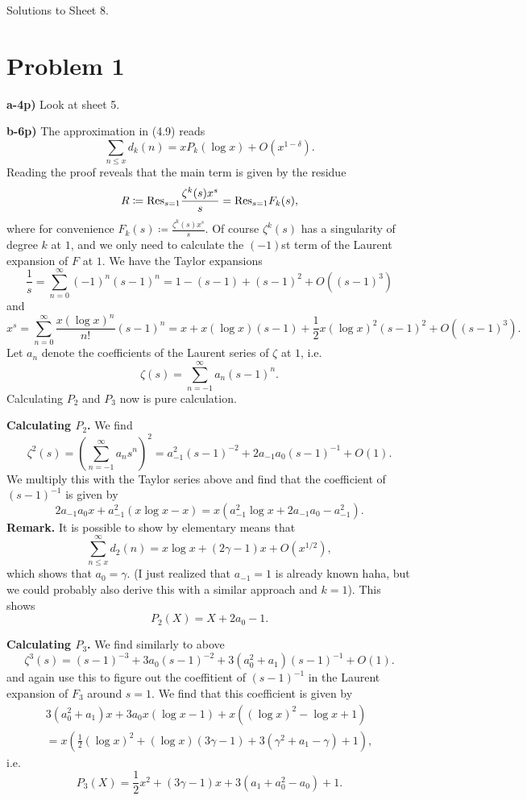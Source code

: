 \documentclass[a4paper,11pt]{article}
\author{Max von Consbruch}
\begin{document}
\begin{center}
    \huge{Solutions to Sheet 8.}
\end{center}

\section*{Problem 1}
\textbf{a-4p)} Look at sheet 5.

\textbf{b-6p)} The approximation in (4.9) reads 
\[
    \sum_{n \leq x} d_k(n) = x P_k(\log x) + O(x^{1-\delta}).
\]
Reading the proof reveals that the main term is given by the residue
\[
    R \coloneqq \mathrm{Res}_{s=1} \frac{\zeta^k(s) x^s}s = \mathrm{Res}_{s=1} F_k(s),
\]
where for convenience $F_k(s) \coloneqq \frac{\zeta^k(s) x^s}s.$
Of course $\zeta^k(s)$ has a singularity of degree $k$ at $1$, and we only need 
to calculate the $(-1)$st term of the Laurent expansion of $F$ at $1$. 
We have the Taylor expansions
\[
    \frac 1{s} =  \sum_{n=0}^\infty (-1)^n (s-1)^n = 1 - (s-1) + (s-1)^2 + O((s-1)^3)
\]
and
\[
    x^s = \sum_{n=0}^\infty \frac{x(\log x)^n}{n!} (s-1)^n = x + x(\log x)(s-1) + \frac 12x(\log x)^2(s-1)^2 + O((s-1)^3). 
\]
Let $a_n$ denote the coefficients of the Laurent series of $\zeta$ at $1$, i.e.
\[
    \zeta(s) = \sum_{n = -1}^\infty a_n (s-1)^n.
\]
Calculating $P_2$ and $P_3$ now is pure calculation. 

\textbf{Calculating $P_2$.} We find
\[
    \zeta^2(s) = \left( \sum_{n=-1}^\infty a_n s^n \right)^2
    = a_{-1}^2 (s-1)^{-2} + 2a_{-1}a_0 (s-1)^{-1} + O(1).
\]
We multiply this with the Taylor series above and find that the coefficient of 
$(s-1)^{-1}$ is given by 
\[
    2a_{-1}a_0 x + a_{-1}^2 (x \log x - x) = x ( a_{-1}^2 \log x + 2a_{-1}a_0-a_{-1}^2).
\]
\textbf{Remark.} It is possible to show by elementary means that 
\[
    \sum_{n\leq x}^\infty d_2(n) = x \log x + (2\gamma-1)x + O(x^{1/2}),
\]
which shows that $a_0 = \gamma$. (I just realized that $a_{-1} = 1$ is already
known haha, but we could probably also derive this with a similar approach and
$k=1$). This shows 
\[
    P_2(X) = X + 2a_0 - 1.
\]

\textbf{Calculating $P_3$.} We find similarly to above
\[
    \zeta^3(s) = (s-1)^{-3} + 3a_0 (s-1)^{-2} + 3(a_0^2 + a_1)(s-1)^{-1} + O(1).
\]
and again use this to figure out the coeffitient of $(s-1)^{-1}$ in the 
Laurent expansion of $F_3$ around $s=1$. We find that this coefficient is given by
\begin{multline*}
    3(a_0^2 + a_1)x + 3a_0x ( \log x - 1) + x ((\log x)^2 - \log x + 1) \\
    = x ( \frac 12 (\log x)^2 + (\log x)(3 \gamma - 1) + 3 (\gamma^2 + a_1 - \gamma) + 1),
\end{multline*}
i.e.
\[
    P_3(X) = \frac 12x^2 + (3\gamma-1) x + 3(a_1 + a_0^2 - a_0)+1.
\]
\end{document}
